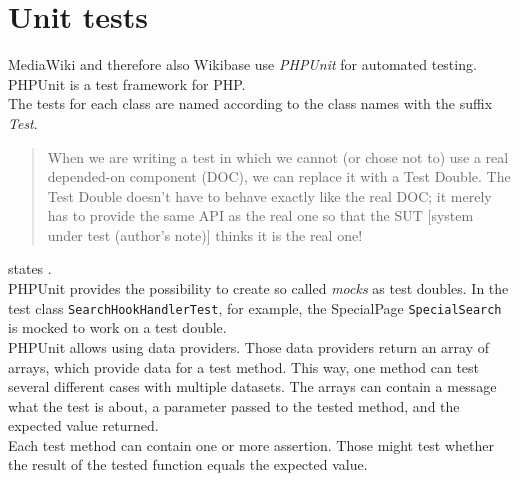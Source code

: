 \section{Unit tests}

MediaWiki and therefore also Wikibase use \textit{PHPUnit} for automated testing. PHPUnit is a test framework for PHP. \\
The tests for each class are named according to the class names with the suffix \textit{Test}. \\
\begin{quote}
 When we are writing a test in which we cannot (or chose not to) use a real depended-on component (DOC), we can replace it with a Test Double. The Test Double doesn't have to behave exactly like the real DOC; it merely has to provide the same API as the real one so that the SUT [system under test (author's note)] thinks it is the real one! 
\end{quote}
states \citet{testing}. \\
PHPUnit provides the possibility to create so called \textit{mocks} as test doubles. In the test class \texttt{SearchHookHandlerTest}, for example, the SpecialPage \texttt{SpecialSearch} is mocked to work on a test double. \\
PHPUnit allows using data providers. Those data providers return an array of arrays, which provide data for a test method. This way, one method can test several different cases with multiple datasets. The arrays can contain a message what the test is about, a parameter passed to the tested method, and the expected value returned. \\
Each test method can contain one or more assertion. Those might test whether the result of the tested function equals the expected value. 

